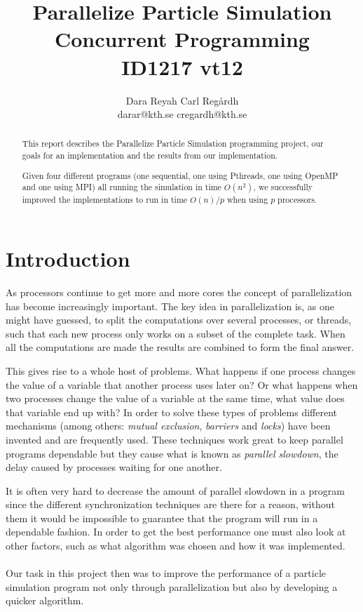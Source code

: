 \documentclass[11pt,a4paper]{article}
\begin{document}
\title{Parallelize Particle Simulation \\ Concurrent Programming \\ ID1217 vt12}
\author{{\LARGE Dara Reyah \quad \quad \quad \quad \quad \quad Carl Reg\aa rdh }\\darar@kth.se \quad \quad \quad \quad \quad \quad \quad \quad \quad \quad cregardh@kth.se}
\date{}
\maketitle
\thispagestyle{empty}
\newpage
\thispagestyle{empty}
\begin{abstract}
This report describes the Parallelize Particle Simulation programming project, our goals for an implementation and the results from our implementation. 

Given four different programs (one sequential, one using Pthreads, one using OpenMP and one using MPI) all running the simulation in time $O(n^{2})$, we successfully improved the implementations to run in time $O(n)/p$ when using $p$ processors.
\end{abstract}
\newpage
\section{Introduction}
 \setcounter{page}{1}
As processors continue to get more and more cores the concept of parallelization has become increasingly important. The key idea in parallelization is, as one might have guessed, to split the computations over several processes, or threads, such that each new process only works on a subset of the complete task. When all the computations are made the results are combined to form the final answer.

This gives rise to a whole host of problems. What happens if one process changes the value of a variable that another process uses later on? Or what happens when two processes change the value of a variable at the same time, what value does that variable end up with? In order to solve these types of problems different mechanisms (among others: \emph{mutual exclusion}, \emph{barriers} and \emph{locks}) have been invented and are frequently used. These techniques work great to keep parallel programs dependable but they cause what is known as \emph{parallel slowdown}, the delay caused by processes waiting for one another.

It is often very hard to decrease the amount of parallel slowdown in a program since the different synchronization techniques are there for a reason, without them it would be impossible to guarantee that the program will run in a dependable fashion. In order to get the best performance one must also look at other factors, such as what algorithm was chosen and how it was implemented.
\\
\\
Our task in this project then was to improve the performance of a particle simulation program not only through parallelization but also by developing a quicker algorithm.
\end{document}
